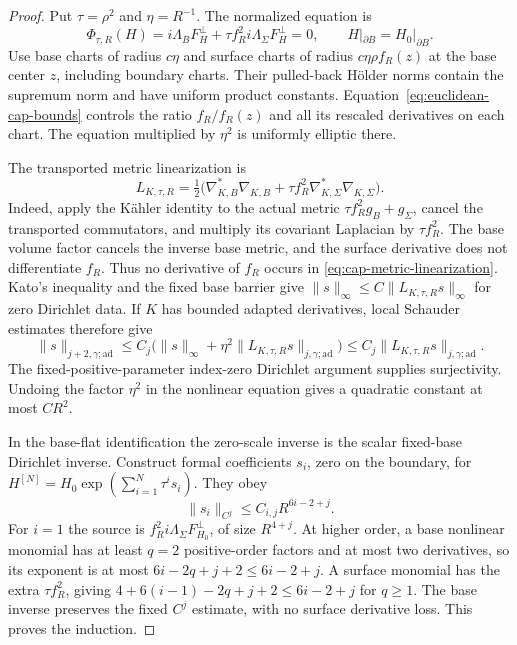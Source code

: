 \documentclass[11pt]{amsart}
\theoremstyle{definition}
\theoremstyle{remark}
\theoremstyle{plain}
\begin{document}
\begin{proof}
Put $\tau=\rho^2$ and $\eta=R^{-1}$. The normalized equation is
\[
 \Phi_{\tau,R}(H)=i\Lambda_BF_H^\perp
             +\tau f_R^2 i\Lambda_\Sigma F_H^\perp=0,
 \qquad H|_{\partial B}=H_0|_{\partial B}.
\]
Use base charts of radius $c\eta$ and surface charts of radius
$c\eta\rho f_R(z)$ at the base center $z$, including boundary
charts. Their pulled-back H\"older norms contain the supremum
norm and have uniform product constants.
Equation~\eqref{eq:euclidean-cap-bounds} controls the ratio
$f_R/f_R(z)$ and all its rescaled derivatives on each chart.
The equation multiplied by $\eta^2$ is uniformly elliptic there.

The transported metric linearization is
\begin{equation}\label{eq:cap-metric-linearization}
 L_{K,\tau,R}=\tfrac12\bigl(\nabla_{K,B}^*\nabla_{K,B}
                  +\tau f_R^2\nabla_{K,\Sigma}^*\nabla_{K,\Sigma}\bigr).
\end{equation}
Indeed, apply the K\"ahler identity to the actual metric
$\tau f_R^2g_B+g_\Sigma$, cancel the transported commutators,
and multiply its covariant Laplacian by $\tau f_R^2$.
The base volume factor cancels the inverse base metric, and the
surface derivative does not differentiate $f_R$. Thus no derivative
of $f_R$ occurs in \eqref{eq:cap-metric-linearization}.
Kato's inequality and the fixed base barrier give
$\|s\|_\infty\leq C\|L_{K,\tau,R}s\|_\infty$ for zero
Dirichlet data. If $K$ has bounded adapted derivatives, local
Schauder estimates therefore give
\begin{equation}\label{eq:cap-metric-adapted-inverse}
 \|s\|_{j+2,\gamma;\mathrm{ad}}
 \leq C_j\bigl(\|s\|_\infty+\eta^2
                    \|L_{K,\tau,R}s\|_{j,\gamma;\mathrm{ad}}\bigr)
 \leq C_j\|L_{K,\tau,R}s\|_{j,\gamma;\mathrm{ad}}.
\end{equation}
The fixed-positive-parameter index-zero Dirichlet argument supplies
surjectivity. Undoing the factor $\eta^2$ in the nonlinear
equation gives a quadratic constant at most $CR^2$.

In the base-flat identification the zero-scale inverse is the
scalar fixed-base Dirichlet inverse. Construct formal coefficients
$s_i$, zero on the boundary, for
$H^{[N]}=H_0\exp(\sum_{i=1}^N\tau^is_i)$. They obey
\begin{equation}\label{eq:cap-formal-coefficients}
 \|s_i\|_{C^j}\leq C_{i,j}R^{6i-2+j}.
\end{equation}
For $i=1$ the source is $f_R^2i\Lambda_\Sigma F_{H_0}^\perp$,
of size $R^{4+j}$. At higher order, a base nonlinear monomial
has at least $q=2$ positive-order factors and at most two
derivatives, so its exponent is at most $6i-2q+j+2\leq6i-2+j$.
A surface monomial has the extra $\tau f_R^2$, giving
$4+6(i-1)-2q+j+2\leq6i-2+j$ for $q\geq1$.
The base inverse preserves the fixed $C^j$ estimate, with no
surface derivative loss. This proves the induction.


\end{proof}
\end{document}
